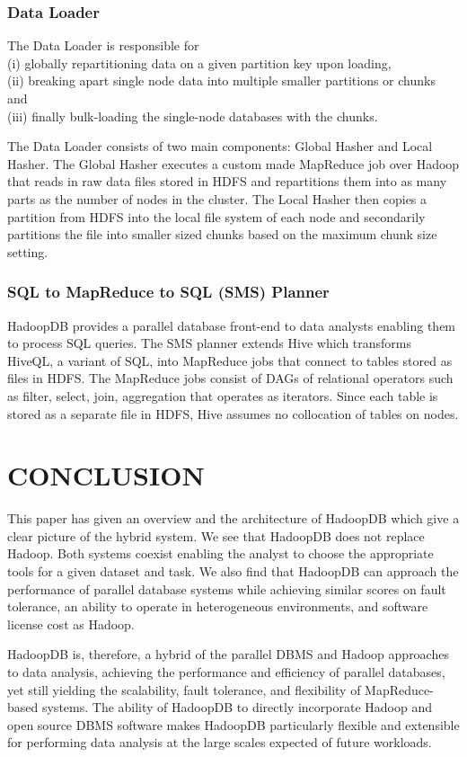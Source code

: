 \documentclass[9pt,twocolumn,twoside]{styles/osajnl}
\newcommand{\TODO}[2][]{\todo[color=red!10,inline,#1]{#2}}
\begin{document}
\subsubsection{Data Loader}
The Data Loader is responsible for 
\\(i) globally repartitioning data on a given partition key upon loading, 
\\(ii) breaking apart single node data into multiple smaller partitions or chunks and 
\\(iii) finally bulk-loading the single-node databases with the chunks.

The Data Loader consists of two main components: Global Hasher and Local Hasher. The Global Hasher executes a custom made MapReduce job over Hadoop that reads in raw data files stored in HDFS and repartitions them into as many parts as the
number of nodes in the cluster. The Local Hasher then copies a partition from HDFS into the
local file system of each node and secondarily partitions the file into smaller sized chunks based on the maximum chunk size setting.

\subsubsection{SQL to MapReduce to SQL (SMS) Planner}
HadoopDB provides a parallel database front-end to data analysts enabling them to process SQL queries. The SMS planner extends Hive\cite{facebook-hive} which transforms HiveQL, a variant of SQL, into MapReduce jobs that connect to tables stored
as files in HDFS. The MapReduce jobs consist of DAGs of relational operators such as filter, select, join, aggregation that operates as iterators. Since each table is stored as a
separate file in HDFS, Hive assumes no collocation of tables on nodes.


\section{CONCLUSION}

This paper has given an overview and the architecture of HadoopDB which give a clear picture of the hybrid system. We see that HadoopDB does not replace Hadoop. Both systems coexist enabling the analyst to choose the appropriate tools for a given dataset and task.  We also find that HadoopDB can approach the performance of parallel database systems while achieving similar scores on fault tolerance, an ability to operate in heterogeneous environments, and software license cost as Hadoop. 

HadoopDB is, therefore, a hybrid of the parallel DBMS and Hadoop approaches to data analysis, achieving the performance and efficiency of parallel databases, yet still yielding the scalability, fault tolerance, and flexibility of MapReduce-based systems. The ability of HadoopDB to directly incorporate Hadoop and open source DBMS software makes HadoopDB particularly flexible and extensible for performing data
analysis at the large scales expected of future workloads.

\TODO{well written}


\end{document}
